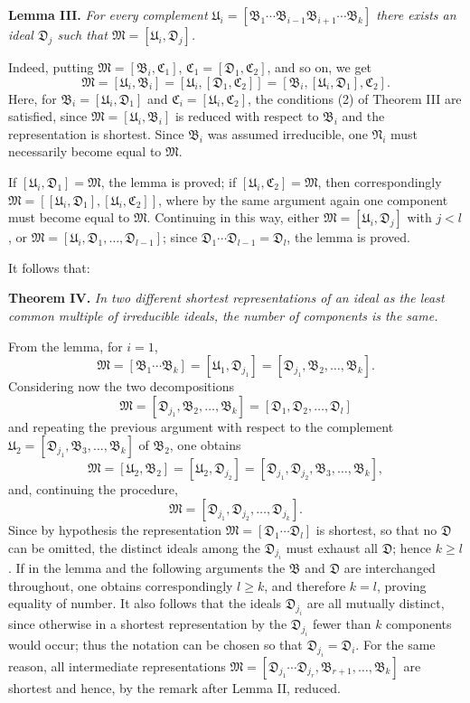\documentclass[11pt]{article}
\newcommand{\ideal}[1]{\mathfrak{#1}}
\begin{document}
\textbf{Lemma III.} \emph{For every complement $\ideal U_i=[\ideal B_1\cdots\ideal B_{i-1}\ideal B_{i+1}\cdots\ideal B_k]$ there exists an ideal $\ideal D_j$ such that $\ideal M=[\ideal U_i,\ideal D_j]$.}

Indeed, putting $\ideal M=[\ideal B_i,\ideal C_1]$, $\ideal C_1=[\ideal D_1,\ideal C_2]$, and so on, we get
\[
 \ideal M=[\ideal U_i,\ideal B_i]
       =[\ideal U_i,[\ideal D_1,\ideal C_2]]
       =[\ideal B_i,[\ideal U_i,\ideal D_1],\ideal C_2].
\]
Here, for $\ideal B_i=[\ideal U_i,\ideal D_1]$ and $\ideal C_i=[\ideal U_i,\ideal C_2]$, the conditions (2) of Theorem III are satisfied, since $\ideal M=[\ideal U_i,\ideal B_i]$ is reduced with respect to $\ideal B_i$ and the representation is shortest. Since $\ideal B_i$ was assumed irreducible, one $\ideal N_i$ must necessarily become equal to $\ideal M$.

If $[\ideal U_i,\ideal D_1]=\ideal M$, the lemma is proved; if $[\ideal U_i,\ideal C_2]=\ideal M$, then correspondingly $\ideal M=[[\ideal U_i,\ideal D_1],[\ideal U_i,\ideal C_2]]$, where by the same argument again one component must become equal to $\ideal M$. Continuing in this way, either $\ideal M=[\ideal U_i,\ideal D_j]$ with $j<l$, or $\ideal M=[\ideal U_i,\ideal D_1,\ldots,\ideal D_{l-1}]$; since $\ideal D_1\cdots\ideal D_{l-1}=\ideal D_l$, the lemma is proved.

It follows that:

\textbf{Theorem IV.} \emph{In two different shortest representations of an ideal as the least common multiple of irreducible ideals, the number of components is the same.}

From the lemma, for $i=1$,
\[
 \ideal M=[\ideal B_1\cdots\ideal B_k]
       =[\ideal U_1,\ideal D_{j_1}]
       =[\ideal D_{j_1},\ideal B_2,\ldots,\ideal B_k].
\]
Considering now the two decompositions
\[
 \ideal M=[\ideal D_{j_1},\ideal B_2,\ldots,\ideal B_k]
          =[\ideal D_1,\ideal D_2,\ldots,\ideal D_l]
\]
and repeating the previous argument with respect to the complement $\ideal U_2=[\ideal D_{j_1},\ideal B_3,\ldots,\ideal B_k]$ of $\ideal B_2$, one obtains
\[
 \ideal M=[\ideal U_2,\ideal B_2]=[\ideal U_2,\ideal D_{j_2}]
          =[\ideal D_{j_1},\ideal D_{j_2},\ideal B_3,\ldots,\ideal B_k],
\]
and, continuing the procedure,
\[
 \ideal M=[\ideal D_{j_1},\ideal D_{j_2},\ldots,\ideal D_{j_k}].
\]
Since by hypothesis the representation $\ideal M=[\ideal D_1\cdots\ideal D_l]$ is shortest, so that no $\ideal D$ can be omitted, the distinct ideals among the $\ideal D_{j_i}$ must exhaust all $\ideal D$; hence $k\ge l$. If in the lemma and the following arguments the $\ideal B$ and $\ideal D$ are interchanged throughout, one obtains correspondingly $l\ge k$, and therefore $k=l$, proving equality of number. It also follows that the ideals $\ideal D_{j_i}$ are all mutually distinct, since otherwise in a shortest representation by the $\ideal D_{j_i}$ fewer than $k$ components would occur; thus the notation can be chosen so that $\ideal D_{j_i}=\ideal D_i$. For the same reason, all intermediate representations $\ideal M=[\ideal D_{j_1}\cdots\ideal D_{j_r},\ideal B_{r+1},\ldots,\ideal B_k]$ are shortest and hence, by the remark after Lemma II, reduced.
\end{document}
